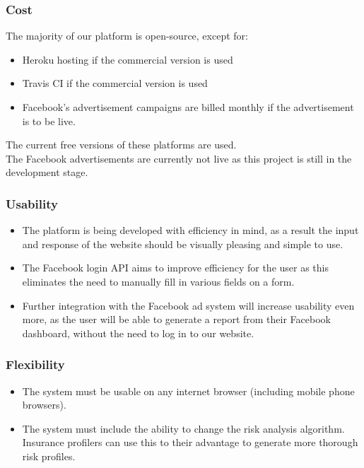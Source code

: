 \documentclass{article}
\begin{document}
		\subsubsection{Cost}
		The majority of our platform is open-source, except for:
		\begin{itemize}
			\item Heroku hosting if the commercial version is used
			\item Travis CI if the commercial version is used
			\item Facebook's advertisement campaigns are billed monthly if the advertisement is to be live.
		\end{itemize}
		The current free versions of these platforms are used. \\
		The Facebook advertisements are currently not live as this project is still in the development stage.

		\subsubsection{Usability}
		\begin{itemize}
			\item The platform is being developed with efficiency in mind, as a result the input and response of the website should be visually pleasing and simple to use.
			\item The Facebook login API aims to improve efficiency for the user as this eliminates the need to manually fill in various fields on a form.
			\item Further integration with the Facebook ad system will increase usability even more, as the user will be able to generate a report from their Facebook dashboard, without the need to log in to our website.
		\end{itemize}
		
		\subsubsection{Flexibility}
		\begin{itemize}
			\item The system must be usable on any internet browser (including mobile phone browsers). 
			\item The system must include the ability to change the risk analysis algorithm. Insurance profilers can use this to their advantage to generate more thorough risk profiles. 
		\end{itemize}
		
\end{document}
